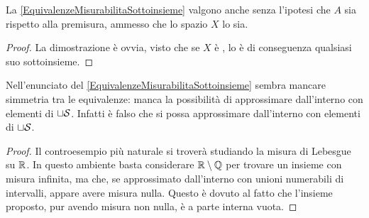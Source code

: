 \begin{corollary}\label{EquivalenzeMisurabilitaSpazio}
	La \cref{EquivalenzeMisurabilitaSottoinsieme} valgono anche senza l'ipotesi che $A$ sia \sigfin[o] rispetto alla premisura, ammesso che lo spazio $X$ lo sia.
\end{corollary}
\begin{proof}
	La dimostrazione è ovvia, visto che se $X$ è \sigfin[o], lo è di conseguenza qualsiasi suo sottoinsieme.
\end{proof}

\begin{remark}
	Nell'enunciato del \cref{EquivalenzeMisurabilitaSottoinsieme} sembra mancare simmetria tra le equivalenze: manca la possibilità di approssimare dall'interno con elementi di $\sqcup\S$. Infatti è falso che si possa approssimare dall'interno con elementi di $\sqcup\S$.
\end{remark}
\begin{proof}
	Il controesempio più naturale si troverà studiando la misura di Lebesgue su $\R$. In questo ambiente basta considerare $\R\setminus\mathbb Q$ per trovare un insieme con misura infinita, ma che, se approssimato dall'interno con unioni numerabili di intervalli, appare avere misura nulla. Questo è dovuto al fatto che l'insieme proposto, pur avendo misura non nulla, è a parte interna vuota.
\end{proof}




